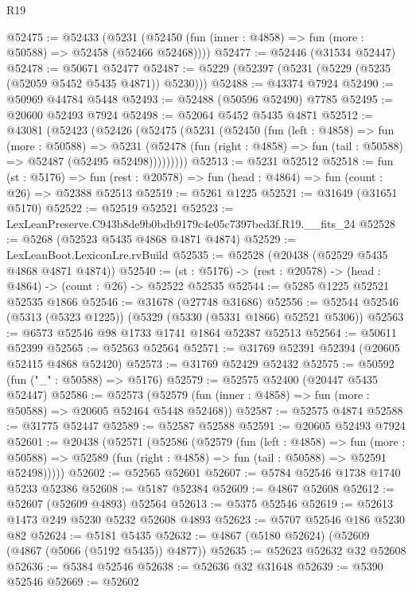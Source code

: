 \begin{lexlean}{R19}
\begin{coremodule}
@52475 := @52433
    (@5231 (@52450 (fun (inner : @4858) => fun (more : @50588) => @52458 (@52466 @52468))))
@52477 := @52446 (@31534 @52447)
@52478 := @50671 @52477
@52487 := @5229 (@52397 (@5231 (@5229 (@5235 (@52059 @5452 @5435 @4871)) @5230)))
@52488 := @43374 @7924
@52490 := @50969 @44784 @5448
@52493 := @52488 (@50596 @52490) @7785
@52495 := @20600 @52493 @7924
@52498 := @52064 @5452 @5435 @4871
@52512 := @43081
    (@52423
      (@52426
        (@52475
          (@5231
            (@52450
              (fun (left : @4858) =>
              fun (more : @50588) =>
              @5231
                (@52478
                  (fun (right : @4858) => fun (tail : @50588) => @52487 (@52495 @52498)))))))))
@52513 := @5231 @52512
@52518 := fun (st : @5176) =>
  fun (rest : @20578) => fun (head : @4864) => fun (count : @26) => @52388 @52513
@52519 := @5261 @1225
@52521 := @31649 (@31651 @5170)
@52522 := @52519 @52521
@52523 := LexLeanPreserve.C943b8de9b0bdb9179c4e05c7397bed3f.R19.__fits_24
@52528 := @5268 (@52523 @5435 @4868 @4871 @4874)
@52529 := LexLeanBoot.LexiconLre.rvBuild
@52535 := @52528 (@20438 (@52529 @5435 @4868 @4871 @4874))
@52540 := (st : @5176) -> (rest : @20578) -> (head : @4864) -> (count : @26) -> @52522 @52535
@52544 := @5285 @1225 @52521 @52535 @1866
@52546 := @31678 (@27748 @31686)
@52556 := @52544 @52546 (@5313 (@5323 @1225)) (@5329 (@5330 (@5331 @1866) @52521 @5306))
@52563 := @6573 @52546 @98 @1733 @1741 @1864 @52387 @52513
@52564 := @50611 @52399
@52565 := @52563 @52564
@52571 := @31769 @52391 @52394 (@20605 @52415 @4868 @52420)
@52573 := @31769 @52429 @52432
@52575 := @50592 (fun ("_" : @50588) => @5176)
@52579 := @52575 @52400 (@20447 @5435 @52447)
@52586 := @52573 (@52579 (fun (inner : @4858) => fun (more : @50588) => @20605 @52464 @5448 @52468))
@52587 := @52575 @4874
@52588 := @31775 @52447
@52589 := @52587 @52588
@52591 := @20605 @52493 @7924
@52601 := @20438
    (@52571
      (@52586
        (@52579
          (fun (left : @4858) =>
          fun (more : @50588) =>
          @52589 (fun (right : @4858) => fun (tail : @50588) => @52591 @52498)))))
@52602 := @52565 @52601
@52607 := @5784 @52546 @1738 @1740 @5233 @52386
@52608 := @5187 @52384
@52609 := @4867 @52608
@52612 := @52607 (@52609 @4893) @52564
@52613 := @5375 @52546
@52619 := @52613 @1473 @249 @5230 @5232 @52608 @4893
@52623 := @5707 @52546 @186 @5230 @82
@52624 := @5181 @5435
@52632 := @4867 (@5180 @52624) (@52609 (@4867 (@5066 (@5192 @5435)) @4877))
@52635 := @52623 @52632 @32 @52608
@52636 := @5384 @52546
@52638 := @52636 @32 @31648
@52639 := @5390 @52546
@52669 := @52602

\end{coremodule}
\end{lexlean}
